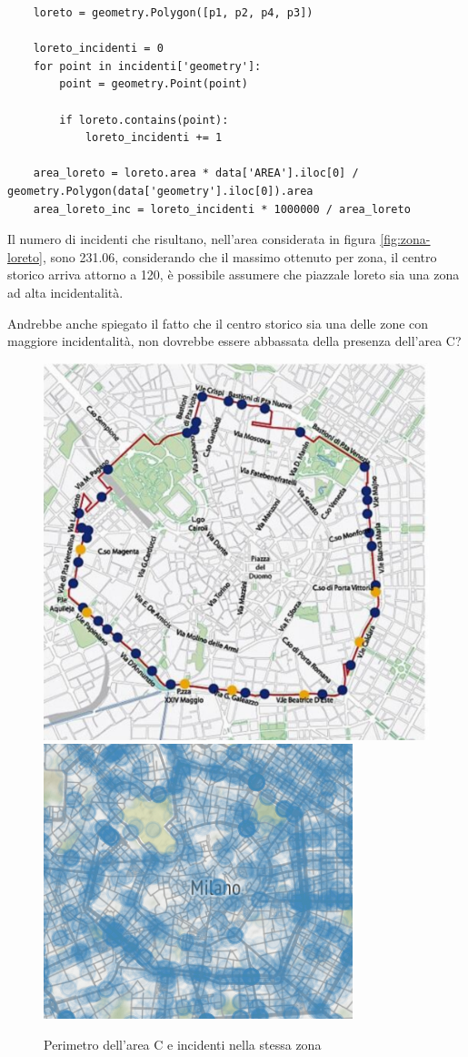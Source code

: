 \documentclass[a4paper]{report}
\begin{document}
\begin{lstlisting}
    loreto = geometry.Polygon([p1, p2, p4, p3])

    loreto_incidenti = 0
    for point in incidenti['geometry']: 
        point = geometry.Point(point)

        if loreto.contains(point): 
            loreto_incidenti += 1

    area_loreto = loreto.area * data['AREA'].iloc[0] / geometry.Polygon(data['geometry'].iloc[0]).area
    area_loreto_inc = loreto_incidenti * 1000000 / area_loreto
\end{lstlisting}

Il numero di incidenti che risultano, nell'area considerata in figura \ref{fig:zona-loreto}, 
sono 231.06, considerando che il massimo ottenuto per zona, il centro storico arriva attorno a 120, 
è possibile assumere che piazzale loreto sia una zona ad alta incidentalità.

Andrebbe anche spiegato il fatto che il centro storico sia una delle zone con maggiore incidentalità, 
non dovrebbe essere abbassata della presenza dell'area C?

\begin{figure}
    \includegraphics[width=0.48\linewidth]{../dataset/area_c/perimetro_area_c.png}
    \includegraphics[width=0.52\linewidth]{../src/area_c/area_c_incidenti.png}
    \caption{Perimetro dell'area C e incidenti nella stessa zona}
    \label{fig:perimetro-area-c}
\end{figure}
\end{document}
